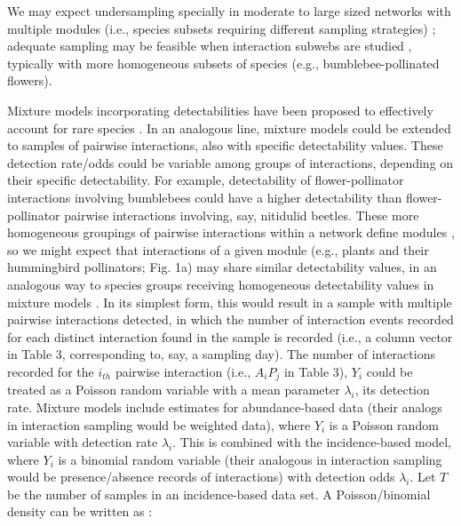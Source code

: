 \documentclass[12pt]{article}
\begin{document}
We may expect undersampling specially in moderate to large sized networks with multiple modules (i.e., species subsets requiring different sampling strategies) \citep{E31/2562,Olesen:2011a,Chacoff:2012}; adequate sampling may be feasible when interaction subwebs are studied \citep{Olesen:2011a,Vizentin-Bugoni:2014hc}, typically with more homogeneous subsets of species (e.g., bumblebee-pollinated flowers).  

Mixture models incorporating detectabilities have been proposed to effectively account for rare species \citep{Mao:2005tka}. In an analogous line, mixture models could be extended to samples of pairwise interactions, also with specific detectability values. These detection rate\slash odds could be variable among groups of interactions, depending on their specific detectability. For example, detectability of flower-pollinator interactions involving bumblebees could have a higher detectability than flower-pollinator pairwise interactions involving, say, nitidulid beetles. These more homogeneous groupings of pairwise interactions within a network define modules \citep{Bascompte:2014to}, so we might expect that interactions of a given module (e.g., plants and their hummingbird pollinators; Fig. 1a) may share similar detectability values, in an analogous way to species groups receiving homogeneous detectability values in mixture models \citep{Mao:2005tka}. In its simplest form, this would result in a sample with multiple pairwise interactions detected, in which the number of interaction events recorded for each distinct interaction found in the sample is recorded (i.e., a column vector in Table 3, corresponding to, say, a sampling day). The number of interactions recorded for the $i_{th}$ pairwise interaction (i.e., $A_iP_j$ in Table 3), $Y_i$ could be treated as a Poisson random variable with a mean parameter $\lambda_i$, its detection rate. Mixture models \citep{Mao:2005tka} include estimates for abundance-based data (their analogs in interaction sampling would be weighted data), where $Y_i$ is a Poisson random variable with detection rate $\lambda_i$. This is combined with the incidence-based model, where $Y_i$ is a binomial random variable (their analogous in interaction sampling would be presence\slash absence records of interactions) with detection odds $\lambda_i$. Let $T$ be the number of samples in an incidence-based data set. A Poisson\slash binomial density can be written as \citep{Mao:2005tka}:
\end{document}
